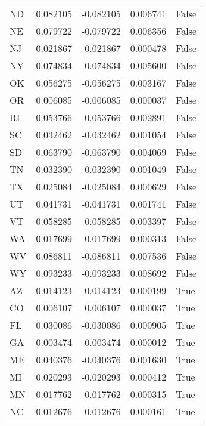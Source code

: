 \begin{table}
\begin{tabular}{lrrrl}
      ND &   0.082105 & -0.082105 &       0.006741 &         False \\
      NE &   0.079722 & -0.079722 &       0.006356 &         False \\
      NJ &   0.021867 & -0.021867 &       0.000478 &         False \\
      NY &   0.074834 & -0.074834 &       0.005600 &         False \\
      OK &   0.056275 & -0.056275 &       0.003167 &         False \\
      OR &   0.006085 & -0.006085 &       0.000037 &         False \\
      RI &   0.053766 &  0.053766 &       0.002891 &         False \\
      SC &   0.032462 & -0.032462 &       0.001054 &         False \\
      SD &   0.063790 & -0.063790 &       0.004069 &         False \\
      TN &   0.032390 & -0.032390 &       0.001049 &         False \\
      TX &   0.025084 & -0.025084 &       0.000629 &         False \\
      UT &   0.041731 & -0.041731 &       0.001741 &         False \\
      VT &   0.058285 &  0.058285 &       0.003397 &         False \\
      WA &   0.017699 & -0.017699 &       0.000313 &         False \\
      WV &   0.086811 & -0.086811 &       0.007536 &         False \\
      WY &   0.093233 & -0.093233 &       0.008692 &         False \\
      AZ &   0.014123 & -0.014123 &       0.000199 &          True \\
      CO &   0.006107 &  0.006107 &       0.000037 &          True \\
      FL &   0.030086 & -0.030086 &       0.000905 &          True \\
      GA &   0.003474 & -0.003474 &       0.000012 &          True \\
      ME &   0.040376 & -0.040376 &       0.001630 &          True \\
      MI &   0.020293 & -0.020293 &       0.000412 &          True \\
      MN &   0.017762 & -0.017762 &       0.000315 &          True \\
      NC &   0.012676 & -0.012676 &       0.000161 &          True \\

\end{tabular}
\end{table}
